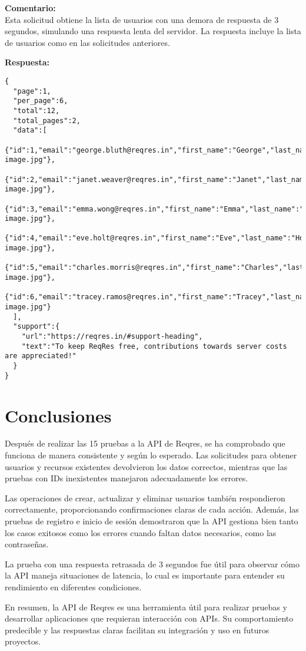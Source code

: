 \documentclass[12pt,a4paper]{article}
\begin{document}
\textbf{Comentario:}\\
Esta solicitud obtiene la lista de usuarios con una demora de respuesta de 3 segundos, simulando una respuesta lenta del servidor. La respuesta incluye la lista de usuarios como en las solicitudes anteriores.

\textbf{Respuesta:}
\begin{samepage}
\begin{verbatim}
{
  "page":1,
  "per_page":6,
  "total":12,
  "total_pages":2,
  "data":[
    {"id":1,"email":"george.bluth@reqres.in","first_name":"George","last_name":"Bluth","avatar":"https://reqres.in/img/faces/1-image.jpg"},
    {"id":2,"email":"janet.weaver@reqres.in","first_name":"Janet","last_name":"Weaver","avatar":"https://reqres.in/img/faces/2-image.jpg"},
    {"id":3,"email":"emma.wong@reqres.in","first_name":"Emma","last_name":"Wong","avatar":"https://reqres.in/img/faces/3-image.jpg"},
    {"id":4,"email":"eve.holt@reqres.in","first_name":"Eve","last_name":"Holt","avatar":"https://reqres.in/img/faces/4-image.jpg"},
    {"id":5,"email":"charles.morris@reqres.in","first_name":"Charles","last_name":"Morris","avatar":"https://reqres.in/img/faces/5-image.jpg"},
    {"id":6,"email":"tracey.ramos@reqres.in","first_name":"Tracey","last_name":"Ramos","avatar":"https://reqres.in/img/faces/6-image.jpg"}
  ],
  "support":{
    "url":"https://reqres.in/#support-heading",
    "text":"To keep ReqRes free, contributions towards server costs are appreciated!"
  }
}
\end{verbatim}
\end{samepage}

\newpage

\section{Conclusiones}

Después de realizar las 15 pruebas a la API de Reqres, se ha comprobado que funciona de manera consistente y según lo esperado. Las solicitudes para obtener usuarios y recursos existentes devolvieron los datos correctos, mientras que las pruebas con IDs inexistentes manejaron adecuadamente los errores.

Las operaciones de crear, actualizar y eliminar usuarios también respondieron correctamente, proporcionando confirmaciones claras de cada acción. Además, las pruebas de registro e inicio de sesión demostraron que la API gestiona bien tanto los casos exitosos como los errores cuando faltan datos necesarios, como las contraseñas.

La prueba con una respuesta retrasada de 3 segundos fue útil para observar cómo la API maneja situaciones de latencia, lo cual es importante para entender su rendimiento en diferentes condiciones.

En resumen, la API de Reqres es una herramienta útil para realizar pruebas y desarrollar aplicaciones que requieran interacción con APIs. Su comportamiento predecible y las respuestas claras facilitan su integración y uso en futuros proyectos.
\end{document}
